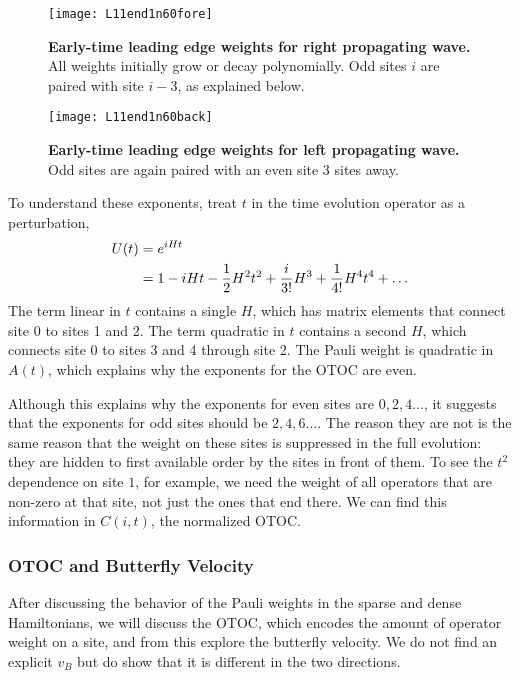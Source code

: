 \begin{figure}
	\centering
	\texttt{[image: L11end1n60fore]}
	\caption{\textbf{Early-time leading edge weights for right propagating wave.} All weights initially grow or decay polynomially. Odd sites $i$ are paired with site $i-3$, as explained below.}
	\label{fig:L11end1n60fore}
\end{figure}
\begin{figure}
	\centering
	\texttt{[image: L11end1n60back]}
	\caption{\textbf{Early-time leading edge weights for left propagating wave.} Odd sites are again paired with an even site 3 sites away.}
	\label{fig:L11end1n60back}
\end{figure}

To understand these exponents, treat $t$ in the time evolution operator as a perturbation,
\begin{align}
U(t) &= e^{iHt}\nonumber\\
&= 1-iHt-\frac{1}{2} H^2t^2+\frac{i}{3!}H^3+\frac{1}{4!}H^4t^4+\dots\label{eqn:expansion}
\end{align}
The term linear in $t$ contains a single $H$, which has matrix elements that connect site 0 to sites 1 and 2. The term quadratic in $t$ contains a second $H$, which connects site 0 to sites 3 and 4 through site 2. The Pauli weight is quadratic in $A(t)$, which explains why the exponents for the OTOC are even.

Although this explains why the exponents for even sites are $0,2,4\dots$, it suggests that the exponents for odd sites should be $2,4,6\dots$. The reason they are not is the same reason that the weight on these sites is suppressed in the full evolution: they are hidden to first available order by the sites in front of them. To see the $t^2$ dependence on site $1$, for example, we need the weight of all operators that are non-zero at that site, not just the ones that end there. We can find this information in $C(i,t)$, the normalized OTOC.

\subsubsection{OTOC and Butterfly Velocity} \label{subsub:otoc}

After discussing the behavior of the Pauli weights in the sparse and dense Hamiltonians, we will discuss the OTOC, which encodes the amount of operator weight on a site, and from this explore the butterfly velocity. We do not find an explicit $v_B$ but do show that it is different in the two directions. 

